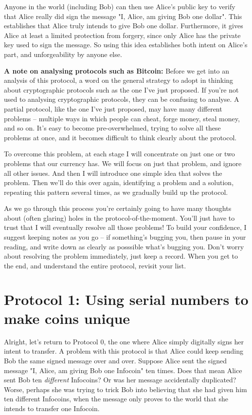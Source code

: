 \documentclass[12pt]{book}
\newcounter{problem}[chapter]
\begin{document}
Anyone in the world (including Bob) can then use Alice's public key to
verify that Alice really did sign the message "I, Alice, am giving Bob
one dollar".  This establishes that Alice truly intends to give Bob
one dollar. Furthermore, it gives Alice at least a limited protection
from forgery, since only Alice has the private key used to sign the
message.  So using this idea establishes both intent on Alice's part,
and unforgeability by anyone else.

\textbf{A note on analysing protocols such as Bitcoin:} Before we get
into an analysis of this protocol, a word on the general strategy to
adopt in thinking about cryptographic protocols such as the one I've
just proposed.  If you're not used to analysing cryptographic
protocols, they can be confusing to analyse.  A partial protocol, like
the one I've just proposed, may have many different problems --
multiple ways in which people can cheat, forge money, steal money, and
so on.  It's easy to become pre-overwhelmed, trying to solve all these
problems at once, and it becomes difficult to think clearly about the
protocol.

To overcome this problem, at each stage I will concentrate on just one
or two problems that our currency has.  We will focus on just that
problem, and ignore all other issues.  And then I will introduce one
simple idea that solves the problem.  Then we'll do this over again,
identifying a problem and a solution, repeating this pattern several
times, as we gradually build up the protocol.

As we go through this process you're certainly going to have many
thoughts about (often glaring) holes in the protocol-of-the-moment.
You'll just have to trust that I will eventually resolve all those
problems!  To build your confidence, I suggest keeping notes as you go
-- if something's bugging you, then pause in your reading, and write
down as clearly as posssible what's bugging you.  Don't worry about
resolving the problem immediately, just keep a record.  When you get
to the end, and understand the entire protocol, revisit your list.

\section{Protocol 1: Using serial numbers to make coins unique}

Alright, let's return to Protocol 0, the one where Alice simply
digitally signs her intent to transfer.  A problem with this protocol
is that Alice could keep sending Bob the same signed message over and
over.  Suppose Alice sent the signed message "I, Alice, am giving Bob
one Infocoin" ten times.  Does that mean Alice sent Bob ten
\emph{different} Infocoins?  Or was her message accidentally
duplicated?  Worse, perhaps she was trying to trick Bob into believing
that she had given him ten different Infocoins, when the message only
proves to the world that she intends to transfer one Infocoin.
\end{document}
